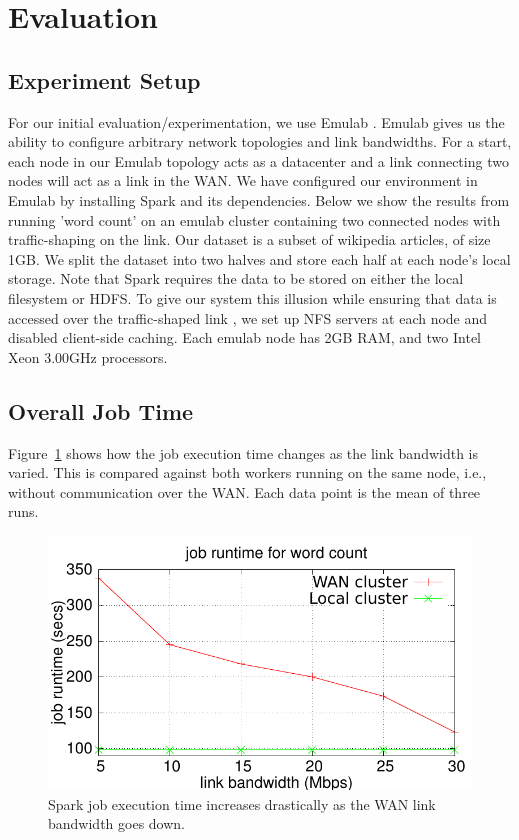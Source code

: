 \section{Evaluation}

\subsection{Experiment Setup}
For our initial evaluation/experimentation, we use Emulab \cite{2}. Emulab gives us the ability to configure arbitrary network topologies and link bandwidths. For a start, each node in our Emulab topology acts as a datacenter and a link connecting two nodes will act as a link in the WAN. We have configured our environment in Emulab by installing Spark and its dependencies.  Below we show the results from running 'word count' on an emulab cluster containing two connected nodes with traffic-shaping on the link. Our dataset is a subset of wikipedia articles, of size 1GB. We split the dataset into two halves and store each half at each node's local storage. Note that Spark requires the data to be stored on either the local filesystem or HDFS. To give our system this illusion while ensuring that data is accessed over the traffic-shaped link , we set up NFS servers at each node and disabled client-side caching. Each emulab node has 2GB RAM, and two Intel Xeon 3.00GHz processors.

\subsection{Overall Job Time}
Figure~\ref{fig:job-time} shows how the job execution time changes as the link bandwidth is varied. This is compared against both workers running on the same node, i.e., without communication over the WAN. Each data point is the mean of three runs. 

\begin{figure}[tb]
\centering\includegraphics[width=\columnwidth]{figs/job-time.pdf}
\vspace{-1.2em}
\caption{Spark job execution time increases drastically as the WAN link bandwidth goes down.}
\label{fig:job-time}
\vspace{.7em}
\end{figure}

